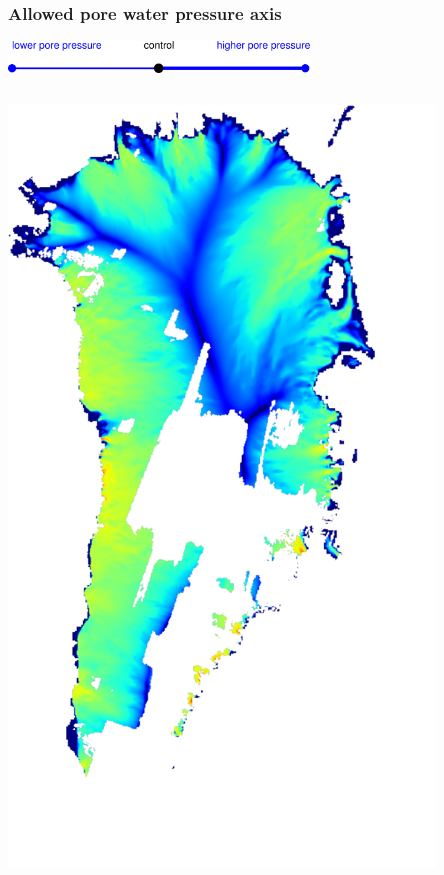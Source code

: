 \documentclass{beamer}
\begin{document}
\begin{frame}
  \frametitle{Allowed pore water pressure axis}

\vspace{-0.1in}
\begin{center}
  \includegraphics[width=0.6\textwidth]{pore_pressure_axis}
\end{center}

\vspace{-0.1in}
\begin{columns}
\begin{column}{0.33\textwidth}
\begin{center}
  \includegraphics[width=0.85\textwidth]{g3km_3_25_95}

\end{center}
\end{column}
\end{columns}
\end{frame}
\end{document}
